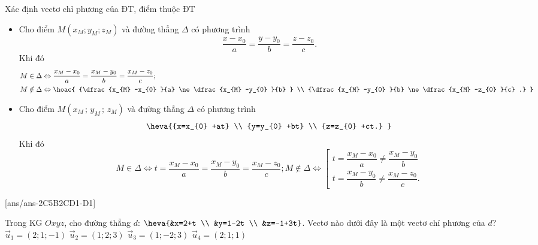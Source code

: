 \begin{dang}{Xác định vectơ chỉ phương của ĐT, điểm thuộc ĐT}
\begin{itemize}
	\item  Cho điểm $M\left(x_{M} ; y_{M} ; z_{M} \right)$ và đường thẳng $\Delta $ có phương trình $$\dfrac{x-x_{0} }{a} =\dfrac{y-y_{0} }{b} =\dfrac{z-z_{0} }{c} .$$ Khi đó
	\begin{align*}
	M\in \Delta & \Leftrightarrow \dfrac{x_{M} -x_{0} }{a} =\dfrac{x_{M} -y_{0} }{b} =\dfrac{x_{M} -z_{0} }{c} ;\\
	 M\notin \Delta &\Leftrightarrow \hoac{ {\dfrac{x_{M} -x_{0} }{a} \ne \dfrac{x_{M} -y_{0} }{b} } \\ {\dfrac{x_{M} -y_{0} }{b} \ne \dfrac{x_{M} -z_{0} }{c} .} }
	\end{align*}
	\item  Cho điểm $M\left(x_{M} \, ;\, y_{M} \, ;\, z_{M} \right)$ và đường thẳng $\Delta $ có phương trình $$\heva{{x=x_{0} +at} \\ {y=y_{0} +bt} \\ {z=z_{0} +ct.} } $$ 
	Khi đó
\[M\in \Delta \Leftrightarrow t=\dfrac{x_{M} -x_{0} }{a} =\dfrac{x_{M} -y_{0} }{b} =\dfrac{x_{M} -z_{0} }{c} ;      M\notin \Delta \Leftrightarrow \left[\begin{array}{l} {t=\dfrac{x_{M} -x_{0} }{a} \ne \dfrac{x_{M} -y_{0} }{b} } \\ {t=\dfrac{x_{M} -y_{0} }{b} \ne \dfrac{x_{M} -z_{0} }{c} .} \end{array}\right. \]
\end{itemize}
\end{dang}
 



\TN
{}[ans/ans-2C5B2CD1-D1]
\begin{ex}%
	Trong KG $Oxyz$, cho đường thẳng $d$: $\heva{&x=2+t \\ &y=1-2t \\ &z=-1+3t}$. Vectơ nào dưới đây là một vectơ chỉ phương của $d$?
	\choice
		{$\overrightarrow{u}_1=(2;1;-1)$}
		{$\overrightarrow{u}_2=(1;2;3)$}
		{\True $\overrightarrow{u}_3=(1;-2;3)$}
		{$\overrightarrow{u}_4=(2;1;1)$}
\end{ex}

